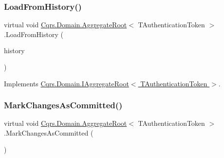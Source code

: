 \mbox{\label{classCqrs_1_1Domain_1_1AggregateRoot_aec873ad6e4c98309cad2d9f1c534aebb}} 
\subsubsection{\texorpdfstring{Load\+From\+History()}{LoadFromHistory()}}
{\footnotesize\ttfamily virtual void \hyperlink{classCqrs_1_1Domain_1_1AggregateRoot}{Cqrs.\+Domain.\+Aggregate\+Root}$<$ T\+Authentication\+Token $>$.Load\+From\+History (\begin{DoxyParamCaption}\item[{I\+Enumerable$<$ \hyperlink{interfaceCqrs_1_1Events_1_1IEvent}{I\+Event}$<$ T\+Authentication\+Token $>$$>$}]{history }\end{DoxyParamCaption})\hspace{0.3cm}{\ttfamily [virtual]}}



Implements \hyperlink{interfaceCqrs_1_1Domain_1_1IAggregateRoot_afe9329ee26ae68613059189ca64dfe60}{Cqrs.\+Domain.\+I\+Aggregate\+Root$<$ T\+Authentication\+Token $>$}.

\mbox{\label{classCqrs_1_1Domain_1_1AggregateRoot_adab968b830e186cb832583910bf6f3a6}} 
\subsubsection{\texorpdfstring{Mark\+Changes\+As\+Committed()}{MarkChangesAsCommitted()}}
{\footnotesize\ttfamily virtual void \hyperlink{classCqrs_1_1Domain_1_1AggregateRoot}{Cqrs.\+Domain.\+Aggregate\+Root}$<$ T\+Authentication\+Token $>$.Mark\+Changes\+As\+Committed (\begin{DoxyParamCaption}{ }\end{DoxyParamCaption})\hspace{0.3cm}{\ttfamily [virtual]}}



